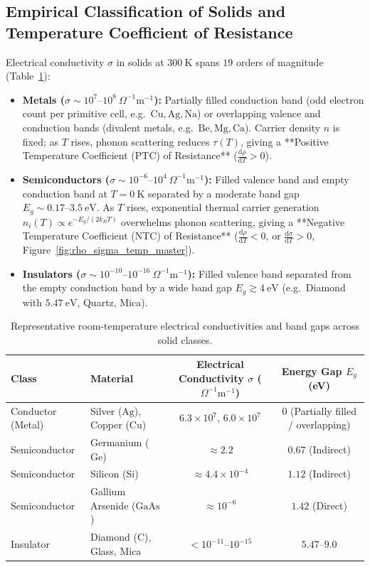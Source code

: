\documentclass[11pt,a4paper]{article}
\newcommand{\dv}[2]{\frac{\mathrm{d}#1}{\mathrm{d}#2}}
\begin{document}
\subsection{Empirical Classification of Solids and Temperature Coefficient of Resistance}
Electrical conductivity $\sigma$ in solids at $300\ \mathrm{K}$ spans $19$ orders of magnitude (Table~\ref{tab:conductivity_master}):
\begin{itemize}
    \item \textbf{Metals ($\sigma \sim 10^7\text{--}10^8\ \Omega^{-1}\mathrm{m^{-1}}$):} Partially filled conduction band (odd electron count per primitive cell, e.g.\ $\text{Cu}, \text{Ag}, \text{Na}$) or overlapping valence and conduction bands (divalent metals, e.g.\ $\text{Be}, \text{Mg}, \text{Ca}$). Carrier density $n$ is fixed; as $T$ rises, phonon scattering reduces $\tau(T)$, giving a **Positive Temperature Coefficient (PTC) of Resistance** ($\dv{\rho}{T} > 0$).
    \item \textbf{Semiconductors ($\sigma \sim 10^{-6}\text{--}10^4\ \Omega^{-1}\mathrm{m^{-1}}$):} Filled valence band and empty conduction band at $T=0\ \mathrm{K}$ separated by a moderate band gap $E_g \sim 0.17\text{--}3.5\ \mathrm{eV}$. As $T$ rises, exponential thermal carrier generation $n_i(T) \propto e^{-E_g/(2k_BT)}$ overwhelms phonon scattering, giving a **Negative Temperature Coefficient (NTC) of Resistance** ($\dv{\rho}{T} < 0$, or $\dv{\sigma}{T} > 0$, Figure~\ref{fig:rho_sigma_temp_master}).
    \item \textbf{Insulators ($\sigma \sim 10^{-10}\text{--}10^{-16}\ \Omega^{-1}\mathrm{m^{-1}}$):} Filled valence band separated from the empty conduction band by a wide band gap $E_g \gtrsim 4\ \mathrm{eV}$ (e.g.\ Diamond with $5.47\ \mathrm{eV}$, Quartz, Mica).
\end{itemize}

\begin{table}[htbp]
\centering
\small
\begin{tabular}{@{}llcc@{}}
\toprule
\textbf{Class} & \textbf{Material} & \textbf{Electrical Conductivity $\sigma$ ($\Omega^{-1}\text{m}^{-1}$)} & \textbf{Energy Gap $E_g$ (eV)} \\
\midrule
Conductor (Metal) & Silver ($\text{Ag}$), Copper ($\text{Cu}$) & $6.3 \times 10^7$, $6.0 \times 10^7$ & $0$ (Partially filled / overlapping) \\
Semiconductor & Germanium ($\text{Ge}$) & $\approx 2.2$ & $0.67$ (Indirect) \\
Semiconductor & Silicon ($\text{Si}$) & $\approx 4.4 \times 10^{-4}$ & $1.12$ (Indirect) \\
Semiconductor & Gallium Arsenide ($\text{GaAs}$) & $\approx 10^{-6}$ & $1.42$ (Direct) \\
Insulator & Diamond ($\text{C}$), Glass, Mica & $< 10^{-11}\text{--}10^{-15}$ & $5.47\text{--}9.0$ \\
\bottomrule
\end{tabular}
\caption{Representative room-temperature electrical conductivities and band gaps across solid classes.}
\label{tab:conductivity_master}
\end{table}
\end{document}
